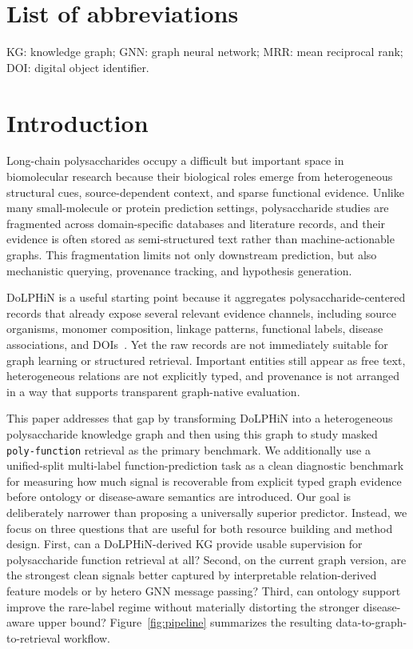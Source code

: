 \documentclass[11pt]{article}
\begin{document}
\section*{List of abbreviations}
KG: knowledge graph; GNN: graph neural network; MRR: mean reciprocal rank; DOI: digital object identifier.

\section{Introduction}
\label{sec:introduction}

Long-chain polysaccharides occupy a difficult but important space in biomolecular research because their biological roles emerge from heterogeneous structural cues, source-dependent context, and sparse functional evidence. Unlike many small-molecule or protein prediction settings, polysaccharide studies are fragmented across domain-specific databases and literature records, and their evidence is often stored as semi-structured text rather than machine-actionable graphs. This fragmentation limits not only downstream prediction, but also mechanistic querying, provenance tracking, and hypothesis generation.

DoLPHiN is a useful starting point because it aggregates polysaccharide-centered records that already expose several relevant evidence channels, including source organisms, monomer composition, linkage patterns, functional labels, disease associations, and DOIs~\cite{xin2025dolphin}. Yet the raw records are not immediately suitable for graph learning or structured retrieval. Important entities still appear as free text, heterogeneous relations are not explicitly typed, and provenance is not arranged in a way that supports transparent graph-native evaluation.

This paper addresses that gap by transforming DoLPHiN into a heterogeneous polysaccharide knowledge graph and then using this graph to study masked \texttt{poly-function} retrieval as the primary benchmark. We additionally use a unified-split multi-label function-prediction task as a clean diagnostic benchmark for measuring how much signal is recoverable from explicit typed graph evidence before ontology or disease-aware semantics are introduced. Our goal is deliberately narrower than proposing a universally superior predictor. Instead, we focus on three questions that are useful for both resource building and method design. First, can a DoLPHiN-derived KG provide usable supervision for polysaccharide function retrieval at all? Second, on the current graph version, are the strongest clean signals better captured by interpretable relation-derived feature models or by hetero GNN message passing? Third, can ontology support improve the rare-label regime without materially distorting the stronger disease-aware upper bound? Figure~\ref{fig:pipeline} summarizes the resulting data-to-graph-to-retrieval workflow.
\end{document}
